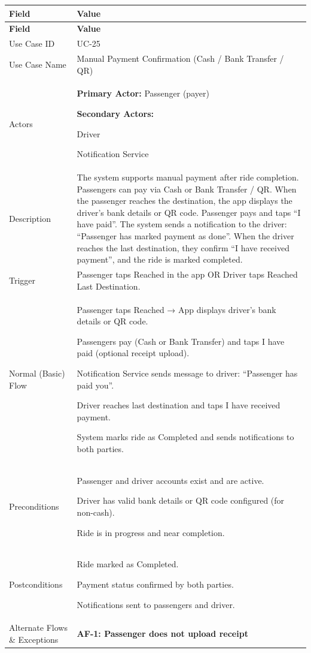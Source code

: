 \begin{longtable}{|p{3.5cm}|p{12cm}|}
\hline
\rowcolor{lightgray!30}
\textbf{Field} & \textbf{Value} \\
\hline
\endfirsthead
\hline
\rowcolor{lightgray!30}
\textbf{Field} & \textbf{Value} \\
\hline
\endhead
\hline
\endfoot
Use Case ID & UC-25 \\
\hline
Use Case Name & Manual Payment Confirmation (Cash / Bank Transfer / QR) \\
\hline
Actors &
\textbf{Primary Actor:} Passenger (payer)

\textbf{Secondary Actors:}

Driver

Notification Service \\
\hline
Description &
The system supports manual payment after ride completion. Passengers can pay via Cash or Bank Transfer / QR. When the passenger reaches the destination, the app displays the driver’s bank details or QR code. Passenger pays and taps “I have paid”. The system sends a notification to the driver: “Passenger has marked payment as done”. When the driver reaches the last destination, they confirm “I have received payment”, and the ride is marked completed. \\
\hline
Trigger &
Passenger taps Reached in the app OR Driver taps Reached Last Destination. \\
\hline
Normal (Basic) Flow &
Passenger taps Reached → App displays driver’s bank details or QR code.

Passengers pay (Cash or Bank Transfer) and taps I have paid (optional receipt upload).

Notification Service sends message to driver: “Passenger has paid you”.

Driver reaches last destination and taps I have received payment.

System marks ride as Completed and sends notifications to both parties. \\
\hline
Preconditions &
Passenger and driver accounts exist and are active.

Driver has valid bank details or QR code configured (for non-cash).

Ride is in progress and near completion. \\
\hline
Postconditions &
Ride marked as Completed.

Payment status confirmed by both parties.

Notifications sent to passengers and driver. \\
\hline
Alternate Flows \& Exceptions &
\textbf{AF-1: Passenger does not upload receipt}


\end{longtable}
